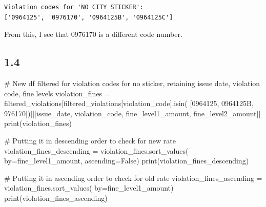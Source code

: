 \documentclass[
  letterpaper,
  DIV=11,
  numbers=noendperiod]{scrartcl}
\newenvironment{Shaded}{\begin{snugshade}}{\end{snugshade}}
\newcommand{\BuiltInTok}[1]{\textcolor[rgb]{0.00,0.23,0.31}{#1}}
\newcommand{\CommentTok}[1]{\textcolor[rgb]{0.37,0.37,0.37}{#1}}
\newcommand{\NormalTok}[1]{\textcolor[rgb]{0.00,0.23,0.31}{#1}}
\newcommand{\OperatorTok}[1]{\textcolor[rgb]{0.37,0.37,0.37}{#1}}
\newcommand{\StringTok}[1]{\textcolor[rgb]{0.13,0.47,0.30}{#1}}
\newcommand{\VariableTok}[1]{\textcolor[rgb]{0.07,0.07,0.07}{#1}}
\begin{document}
\begin{verbatim}
Violation codes for 'NO CITY STICKER':
['0964125', '0976170', '0964125B', '0964125C']
\end{verbatim}

From this, I see that 0976170 is a different code number.

\subsection{1.4}\label{section-3}

\begin{Shaded}
\begin{Highlighting}[]
\CommentTok{\# New df filtered for violation codes for no sticker, retaining issue date, violation code, fine levels}
\NormalTok{violation\_fines }\OperatorTok{=}\NormalTok{ filtered\_violations[filtered\_violations[}\StringTok{\textquotesingle{}violation\_code\textquotesingle{}}\NormalTok{].isin(}
\NormalTok{    [}\StringTok{\textquotesingle{}0964125\textquotesingle{}}\NormalTok{, }\StringTok{\textquotesingle{}0964125B\textquotesingle{}}\NormalTok{, }\StringTok{\textquotesingle{}976170\textquotesingle{}}\NormalTok{])][[}\StringTok{\textquotesingle{}issue\_date\textquotesingle{}}\NormalTok{, }\StringTok{\textquotesingle{}violation\_code\textquotesingle{}}\NormalTok{, }\StringTok{\textquotesingle{}fine\_level1\_amount\textquotesingle{}}\NormalTok{, }\StringTok{\textquotesingle{}fine\_level2\_amount\textquotesingle{}}\NormalTok{]]}
\BuiltInTok{print}\NormalTok{(violation\_fines)}

\CommentTok{\# Putting it in descending order to check for new rate}
\NormalTok{violation\_fines\_descending }\OperatorTok{=}\NormalTok{ violation\_fines.sort\_values(}
\NormalTok{    by}\OperatorTok{=}\StringTok{\textquotesingle{}fine\_level1\_amount\textquotesingle{}}\NormalTok{, ascending}\OperatorTok{=}\VariableTok{False}\NormalTok{)}
\BuiltInTok{print}\NormalTok{(violation\_fines\_descending)}

\CommentTok{\# Putting it in ascending order to check for old rate}
\NormalTok{violation\_fines\_ascending }\OperatorTok{=}\NormalTok{ violation\_fines.sort\_values(}
\NormalTok{    by}\OperatorTok{=}\StringTok{\textquotesingle{}fine\_level1\_amount\textquotesingle{}}\NormalTok{)}
\BuiltInTok{print}\NormalTok{(violation\_fines\_ascending)}
\end{Highlighting}
\end{Shaded}
\end{document}
